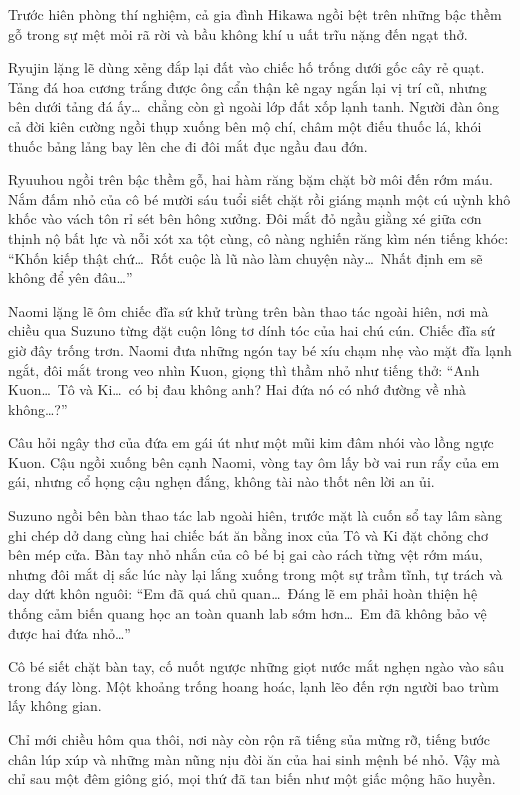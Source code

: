 \documentclass[../main.tex]{subfiles}
\begin{document}
Trước hiên phòng thí nghiệm, cả gia đình Hikawa ngồi bệt trên những bậc thềm gỗ trong sự mệt mỏi rã rời và bầu không khí u uất trĩu nặng đến ngạt thở.

Ryujin lặng lẽ dùng xẻng đắp lại đất vào chiếc hố trống dưới gốc cây rẻ quạt. Tảng đá hoa cương trắng được ông cẩn thận kê ngay ngắn lại vị trí cũ, nhưng bên dưới tảng đá ấy\dots\ chẳng còn gì ngoài lớp đất xốp lạnh tanh. Người đàn ông cả đời kiên cường ngồi thụp xuống bên mộ chí, châm một điếu thuốc lá, khói thuốc bảng lảng bay lên che đi đôi mắt đục ngầu đau đớn.

Ryuuhou ngồi trên bậc thềm gỗ, hai hàm răng bặm chặt bờ môi đến rớm máu. Nắm đấm nhỏ của cô bé mười sáu tuổi siết chặt rồi giáng mạnh một cú uỳnh khô khốc vào vách tôn rỉ sét bên hông xưởng. Đôi mắt đỏ ngầu giằng xé giữa cơn thịnh nộ bất lực và nỗi xót xa tột cùng, cô nàng nghiến răng kìm nén tiếng khóc: ``Khốn kiếp thật chứ\dots\ Rốt cuộc là lũ nào làm chuyện này\dots\ Nhất định em sẽ không để yên đâu\dots''

Naomi lặng lẽ ôm chiếc đĩa sứ khử trùng trên bàn thao tác ngoài hiên, nơi mà chiều qua Suzuno từng đặt cuộn lông tơ dính tóc của hai chú cún. Chiếc đĩa sứ giờ đây trống trơn. Naomi đưa những ngón tay bé xíu chạm nhẹ vào mặt đĩa lạnh ngắt, đôi mắt trong veo nhìn Kuon, giọng thì thầm nhỏ như tiếng thở: ``Anh Kuon\dots\ Tô và Ki\dots\ có bị đau không anh? Hai đứa nó có nhớ đường về nhà không\dots?''

Câu hỏi ngây thơ của đứa em gái út như một mũi kim đâm nhói vào lồng ngực Kuon. Cậu ngồi xuống bên cạnh Naomi, vòng tay ôm lấy bờ vai run rẩy của em gái, nhưng cổ họng cậu nghẹn đắng, không tài nào thốt nên lời an ủi.

Suzuno ngồi bên bàn thao tác lab ngoài hiên, trước mặt là cuốn sổ tay lâm sàng ghi chép dở dang cùng hai chiếc bát ăn bằng inox của Tô và Ki đặt chỏng chơ bên mép cửa. Bàn tay nhỏ nhắn của cô bé bị gai cào rách từng vệt rớm máu, nhưng đôi mắt dị sắc lúc này lại lắng xuống trong một sự trầm tĩnh, tự trách và day dứt khôn nguôi: ``Em đã quá chủ quan\dots\ Đáng lẽ em phải hoàn thiện hệ thống cảm biến quang học an toàn quanh lab sớm hơn\dots\ Em đã không bảo vệ được hai đứa nhỏ\dots''

Cô bé siết chặt bàn tay, cố nuốt ngược những giọt nước mắt nghẹn ngào vào sâu trong đáy lòng. Một khoảng trống hoang hoác, lạnh lẽo đến rợn người bao trùm lấy không gian.

Chỉ mới chiều hôm qua thôi, nơi này còn rộn rã tiếng sủa mừng rỡ, tiếng bước chân lúp xúp và những màn nũng nịu đòi ăn của hai sinh mệnh bé nhỏ. Vậy mà chỉ sau một đêm giông gió, mọi thứ đã tan biến như một giấc mộng hão huyền.
\end{document}
